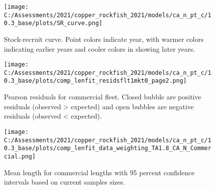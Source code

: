 \documentclass[11pt,
  english,
  a4paper,
]{article}
\begin{document}
\tagmcend\tagstructend


\begin{figure}
\centering
\texttt{[image: C:/Assessments/2021/copper\_rockfish\_2021/models/ca\_n\_pt\_c/10.3\_base/plots/SR\_curve.png]}
\caption{Stock-recruit curve. Point colors indicate year, with warmer colors indicating earlier years and cooler colors in showing later years.\label{fig:bh-curve}}
\end{figure}

\tagmcend\tagstructend


\begin{figure}
\centering
\texttt{[image: C:/Assessments/2021/copper\_rockfish\_2021/models/ca\_n\_pt\_c/10.3\_base/plots/comp\_lenfit\_residsflt1mkt0\_page2.png]}
\caption{Pearson residuals for commercial fleet. Closed bubble are positive residuals (observed \textgreater{} expected) and open bubbles are negative residuals (observed \textless{} expected).\label{fig:com-pearson}}
\end{figure}

\tagmcend\tagstructend


\begin{figure}
\centering
\texttt{[image: C:/Assessments/2021/copper\_rockfish\_2021/models/ca\_n\_pt\_c/10.3\_base/plots/comp\_lenfit\_data\_weighting\_TA1.8\_CA\_N\_Commercial.png]}
\caption{Mean length for commercial lengths with 95 percent confidence intervals based on current samples sizes.\label{fig:com-mean-len-fit}}
\end{figure}

\tagmcend\tagstructend

\end{document}
